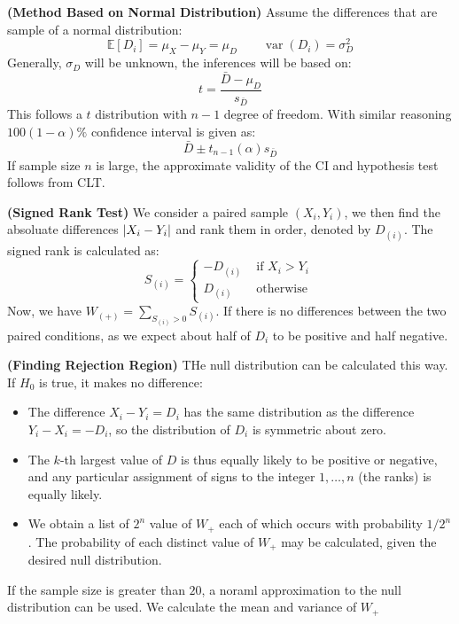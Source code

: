 \begin{remark}{\textbf{(Method Based on Normal Distribution)}}
    Assume the differences that are sample of a normal distribution:
    \begin{equation*}
        \mathbb{E}[D_i] = \mu_X - \mu_Y = \mu_D \qquad \operatorname{var}(D_i) = \sigma^2_D
    \end{equation*}
    Generally, $\sigma_D$ will be unknown, the inferences will be based on:
    \begin{equation*}
        t = \frac{\bar{D} - \mu_D}{s_{\bar{D}}}
    \end{equation*}
    This follows a $t$ distribution with $n-1$ degree of freedom. With similar reasoning $100(1-\alpha)\%$ confidence interval is given as:
    \begin{equation*}
        \bar{D} \pm t_{n-1}(\alpha)s_{\bar{D}}
    \end{equation*}
    If sample size $n$ is large, the approximate validity of the CI and hypothesis test follows from CLT. 
\end{remark}

\begin{definition}{\textbf{(Signed Rank Test)}}
    We consider a paired sample $(X_i, Y_i)$, we then find the absoluate differences $\left| X_i - Y_i \right|$ and rank them in order, denoted by $D_{(i)}$. The signed rank is calculated as: 
    \begin{equation*}
        S_{(i)} = \begin{cases}
            -D_{(i)} & \text{ if } X_i > Y_i \\
            D_{(i)} & \text{ otherwise }
        \end{cases}
    \end{equation*}
    Now, we have $W_{(+)} = \sum_{S_{(i)} > 0} S_{(i)}$. If there is no differences between the two paired conditions, as we expect about half of $D_i$ to be positive and half negative. 
\end{definition}

\begin{remark}{\textbf{(Finding Rejection Region)}}
    THe null distribution can be calculated this way. If $H_0$ is true, it makes no difference:
    \begin{itemize}
        \item The difference $X_i-Y_i = D_i$ has the same distribution as the difference $Y_i - X_i = -D_i$, so the distribution of $D_i$ is symmetric about zero.
        \item The $k$-th largest value of $D$ is thus equally likely to be positive or negative, and any particular assignment of signs to the integer $1,\dots,n$ (the ranks) is equally likely. 
        \item We obtain a list of $2^n$ value of $W_+$ each of which occurs with probability $1/2^n$. The probability of each distinct value of $W_+$ may be calculated, given the desired null distribution. 
    \end{itemize}
    If the sample size is greater than $20$, a noraml approximation to the null distribution can be used. We calculate the mean and variance of $W_+$
\end{remark}


